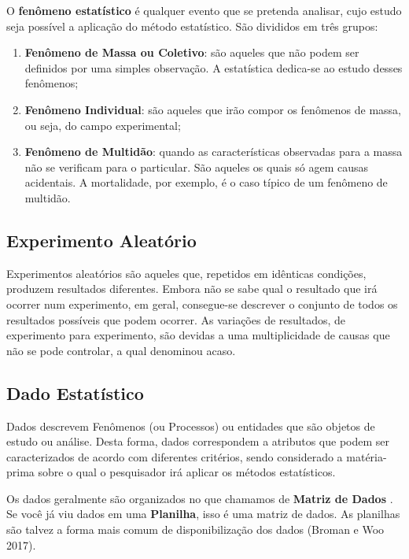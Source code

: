 O \textbf{fenômeno estatístico} é qualquer evento que se pretenda analisar, cujo estudo seja possível a aplicação do método estatístico. São divididos em três grupos:

\begin{enumerate}
  \item \textbf{Fenômeno de Massa ou Coletivo}: são aqueles que não podem ser definidos por uma simples observação. A estatística dedica-se ao estudo desses fenômenos;
  \item \textbf{Fenômeno Individual}: são aqueles que irão compor os fenômenos de massa, ou seja, do campo experimental;
  \item \textbf{Fenômeno de Multidão}: quando as características observadas para a massa não se verificam para o particular. São aqueles os quais só agem causas acidentais. A mortalidade, por exemplo, é o caso típico de um fenômeno de multidão.
\end{enumerate}


\subsection{Experimento Aleatório}

Experimentos aleatórios são aqueles que, repetidos em idênticas condições, produzem resultados diferentes. Embora não se sabe qual o resultado que irá ocorrer num experimento, em geral, consegue-se descrever o conjunto de todos os resultados possíveis que podem ocorrer. As variações de resultados, de experimento para experimento, são devidas a uma multiplicidade de causas que não se pode controlar, a qual denominou acaso.

\subsection{Dado Estatístico}

Dados descrevem Fenômenos (ou Processos) ou entidades que são objetos de estudo ou análise. Desta forma, dados correspondem a atributos que podem ser caracterizados de acordo com diferentes critérios, sendo considerado a matéria-prima sobre o qual o pesquisador irá aplicar os métodos estatísticos.\vskip0.3cm

Os dados geralmente são organizados no que chamamos de \textbf{Matriz de Dados} . Se você já viu dados em uma \textbf{Planilha}, isso é uma matriz de dados. As planilhas são talvez a forma mais comum de disponibilização dos dados (Broman e Woo 2017).\vskip0.3cm


